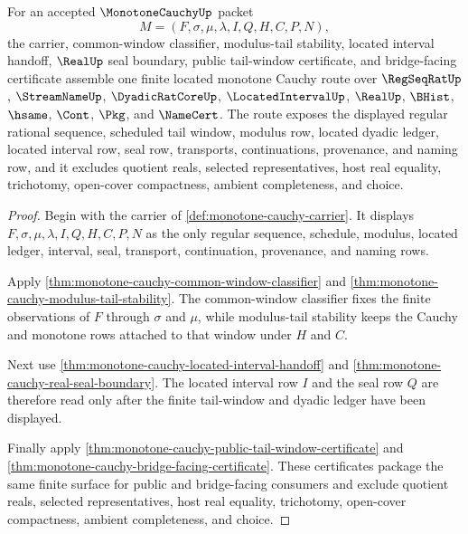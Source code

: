 \begin{theorem}
\label{thm:monotone-cauchy-mature-route-summary}
For an accepted $\MonotoneCauchyUp$ packet
$$
M=(F,\sigma,\mu,\lambda,I,Q,H,C,P,N),
$$
the carrier, common-window classifier, modulus-tail stability, located interval handoff, $\RealUp$ seal boundary, public tail-window certificate, and bridge-facing certificate assemble one finite located monotone Cauchy route over $\RegSeqRatUp$, $\StreamNameUp$, $\DyadicRatCoreUp$, $\LocatedIntervalUp$, $\RealUp$, $\BHist$, $\hsame$, $\Cont$, $\Pkg$, and $\NameCert$. The route exposes the displayed regular rational sequence, scheduled tail window, modulus row, located dyadic ledger, located interval row, seal row, transports, continuations, provenance, and naming row, and it excludes quotient reals, selected representatives, host real equality, trichotomy, open-cover compactness, ambient completeness, and choice.
\end{theorem}
\begin{proof}
Begin with the carrier of \autoref{def:monotone-cauchy-carrier}. It displays $F,\sigma,\mu,\lambda,I,Q,H,C,P,N$ as the only regular sequence, schedule, modulus, located ledger, interval, seal, transport, continuation, provenance, and naming rows.

Apply \autoref{thm:monotone-cauchy-common-window-classifier} and \autoref{thm:monotone-cauchy-modulus-tail-stability}. The common-window classifier fixes the finite observations of $F$ through $\sigma$ and $\mu$, while modulus-tail stability keeps the Cauchy and monotone rows attached to that window under $H$ and $C$.

Next use \autoref{thm:monotone-cauchy-located-interval-handoff} and \autoref{thm:monotone-cauchy-real-seal-boundary}. The located interval row $I$ and the seal row $Q$ are therefore read only after the finite tail-window and dyadic ledger have been displayed.

Finally apply \autoref{thm:monotone-cauchy-public-tail-window-certificate} and \autoref{thm:monotone-cauchy-bridge-facing-certificate}. These certificates package the same finite surface for public and bridge-facing consumers and exclude quotient reals, selected representatives, host real equality, trichotomy, open-cover compactness, ambient completeness, and choice.
\end{proof}

